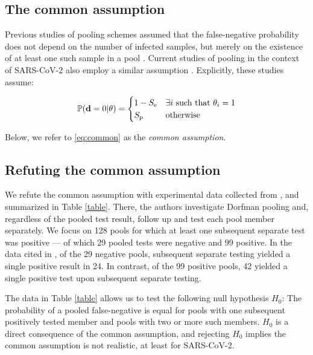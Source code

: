 \documentclass{article}
\begin{document}
\subsection*{The common assumption}\label{subsec:common}
Previous studies of pooling schemes assumed that the false-negative
probability does not depend on the number of infected samples, but
merely on the existence of at least one such sample in a pool
\cite{Kim, OptimalDorfmanPool}. Current studies of pooling in the
context of SARS-CoV-2 also employ a similar assumption
\cite{Simplistic1, Simplistic2}. %
Explicitly, these studies assume:

\begin{align}\label{eq:common}
  \mathbb{P}(\mathbf{d}=0|\theta) = 
  \begin{cases} 
    1-S_{\text{e}} & \exists i\ \text{such that } \theta_i = 1\\
    S_{\text{p}} & \text{otherwise}
  \end{cases} 
\end{align}

Below, we refer to \eqref{eq:common} as the \emph{common
  assumption}. 

\subsection*{Refuting the common assumption}\label{subsec:refute}
We refute the common assumption with experimental data collected from
\cite{Salazar}, and summarized in Table \ref{table}. There, the
authors investigate Dorfman pooling and, regardless of the pooled test
result, follow up and test each pool member separately. We focus on
128 pools for which at least one subsequent separate test was positive
--- of which 29 pooled tests were negative and 99 positive. In the
data cited in \cite{Salazar}, of the 29 negative pools, subsequent
separate testing yielded a single positive result in 24. In contrast,
of the 99 positive pools, 42 yielded a single positive test upon
subsequent separate testing.

The data in Table \ref{table} allows us to test the following null
hypothesis $H_0$: The probability of a pooled false-negative is equal
for pools with one subsequent positively tested member and pools with
two or more such members. $H_0$ is a direct consequence of the common
assumption, and rejecting $H_0$ implies the common assumption is not
realistic, at least for SARS-CoV-2.
\end{document}
